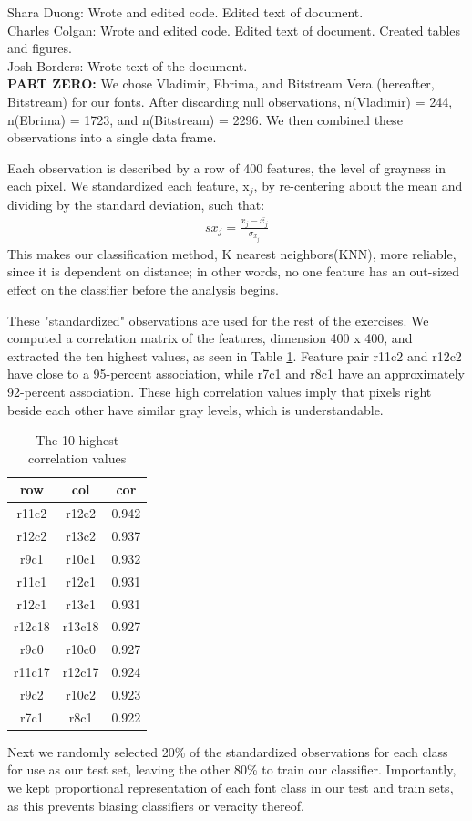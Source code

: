 \documentclass{homework}
\begin{document}
\maketitle

Shara Duong: Wrote and edited code. Edited text of document.\\
Charles Colgan: Wrote and edited code. Edited text of document. Created tables and figures.\\
Josh Borders: Wrote text of the document. \\


\textbf{PART ZERO:} We chose Vladimir, Ebrima, and Bitstream Vera (hereafter, Bitstream) for our fonts. After discarding null observations, n(Vladimir) = 244, n(Ebrima) = 1723, and n(Bitstream) = 2296. We then combined these observations into a single data frame.

Each observation is described by a row of 400 features, the level of grayness in each pixel. We standardized each feature, x$_j$, by re-centering about the mean and dividing by the standard deviation, such that:
\begin{align*}
    sx_j = \frac{x_j-\bar{x_j}}{\sigma_{x_j}} 
\end{align*}
This makes our classification method, K nearest neighbors(KNN), more reliable, since it is dependent on distance; in other words, no one feature has an out-sized effect on the classifier before the analysis begins. 

These "standardized" observations are used for the rest of the exercises. We computed a correlation matrix of the features, dimension 400 x 400, and extracted the ten highest values, as seen in Table \ref{tab:Table 1}. Feature pair r11c2 and r12c2 have close to a 95-percent association, while r7c1 and r8c1 have an approximately 92-percent association. These high correlation values imply that pixels right beside each other have similar gray levels, which is understandable.
\begin{table}[H]
    \centering
    \begin{tabular}{c|c|c}
    row&col&cor\\\hline
  r11c2&r12c2&0.942\\
  r12c2&r13c2&0.937\\
   r9c1&r10c1&0.932\\
  r11c1&r12c1&0.931\\
  r12c1&r13c1&0.931\\
 r12c18&r13c18&0.927\\
   r9c0&r10c0&0.927\\
 r11c17&r12c17&0.924\\
   r9c2&r10c2&0.923\\
   r7c1&r8c1&0.922
    \end{tabular}
    \caption{The 10 highest correlation values}
    \label{tab:Table 1}
\end{table}
Next we randomly selected 20\% of the standardized observations for each class for use as our test set, leaving the other 80\% to train our classifier. Importantly, we kept proportional representation of each font class in our test and train sets, as this prevents biasing classifiers or veracity thereof.
\end{document}
